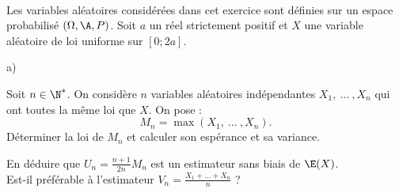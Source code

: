 \documentclass[11pt]{article}%
\begin{document}
\begin{exerciceSP}~\\
  Les variables aléatoires considérées dans cet exercice sont définies
  sur un espace probabilisé $(\Omega , \A , P)$. Soit $a$ un réel
  strictement positif et $X$ une variable aléatoire de loi uniforme
  sur $[0 ; 2a]$.
  \begin{noliste}{a)}
    \setlength{\itemsep}{2mm}
  \item Soit $n \in \N^*$. On considère $n$ variables aléatoires
    indépendantes $X_1,\ \dots\ , X_n$ qui ont toutes la même loi que
    $X$. On pose :
    \[
    M_n = \max ( X_1 ,\ \dots\ , X_n). 
    \]
    Déterminer la loi de $M_n$ et calculer son espérance et sa
    variance.
  \item En déduire que $U_n = \frac{n+1}{2n} M_n$ est un estimateur
    sans biais de $\E(X)$. \\
    Est-il préférable à l'estimateur $V_n = \frac{ X_1 + \dots + X_n
    }{n}$ ?
  \end{noliste}
\end{exerciceSP}


\end{document}
